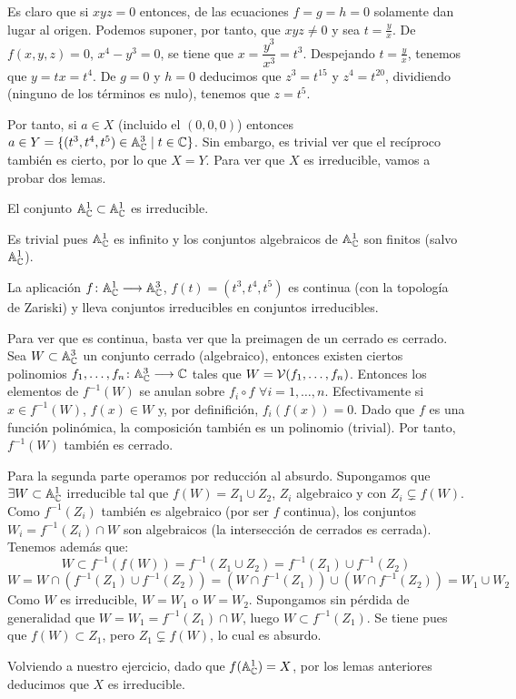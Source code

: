 \documentclass[twoside]{article}
\begin{document}
\begin{ejercicio}{6}
\begin{solucion}
\begin{enumerate}
Es claro que si $xyz = 0$ entonces, de las ecuaciones $f=g=h=0$ solamente dan lugar al origen. Podemos suponer, por tanto, que $xyz\neq 0$ y sea $t=\frac{y}{x}$. De $f(x,y,z)=0$, $x^4-y^3=0$, se tiene que $x=\dfrac{y^3}{x^3}=t^3$. Despejando $t=\frac{y}{x}$, tenemos que $y= tx = t^4$. De $g=0$ y $h=0$ deducimos que $z^3 = t^{15}$ y $z^4 = t^{20}$, dividiendo (ninguno de los términos es nulo), tenemos que $z=t^5$. 

Por tanto, si $a\in X$ (incluido el $(0,0,0)$) entonces $a\in Y=\{(t^3,t^4,t^5)\in\mathbb{A}^3_{\mathbb{C}}\mid t\in \mathbb{C}\}$. Sin embargo, es trivial ver que el recíproco también es cierto, por lo que $X=Y$. Para ver que $X$ es irreducible, vamos a probar dos lemas.

\begin{lema}
El conjunto $\mathbb{A}^1_{\mathbb{C}}\subset \mathbb{A}^1_{\mathbb{C}}$ es irreducible.
\end{lema}
\begin{dem}
Es trivial pues $\mathbb{A}^1_{\mathbb{C}}$ es infinito y los conjuntos algebraicos de $\mathbb{A}^1_{\mathbb{C}}$ son finitos (salvo $\mathbb{A}^1_{\mathbb{C}}$).
\end{dem}

\begin{lema}
La aplicación $f\colon{\mathbb{A}^1_{\mathbb{C}}}\longrightarrow{\mathbb{A}^3_{\mathbb{C}}}$, $f(t)=(t^3,t^4,t^5)$ es continua (con la topología de Zariski) y lleva conjuntos irreducibles en conjuntos irreducibles.
\end{lema}
\begin{dem}
Para ver que es continua, basta ver que la preimagen de un cerrado es cerrado. Sea $W \subset \mathbb{A}^3_{\mathbb{C}}$ un conjunto cerrado (algebraico), entonces existen ciertos polinomios $f_1,\dotsc,f_n\colon{\mathbb{A}^3_{\mathbb{C}}}\longrightarrow{\mathbb{C}}$ tales que $W=\mathcal{V}(f_1,\dotsc,f_n)$. Entonces los elementos de $f^{-1}(W)$ se anulan sobre $f_i \circ f$ $\forall i=1,\dotsc,n$. Efectivamente si $x\in f^{-1}(W)$, $f(x)\in W$ y, por definifición, $f_i(f(x)) = 0$. Dado que $f$ es una función polinómica, la composición también es un polinomio (trivial). Por tanto, $f^{-1}(W)$ también es cerrado.

Para la segunda parte operamos por reducción al absurdo. Supongamos que ${\exists W \subset \mathbb{A}^1_{\mathbb{C}}}$ irreducible tal que $f(W)=Z_1 \cup Z_2$, $Z_i$ algebraico y con $Z_i\subsetneq f(W)$. Como $f^{-1}(Z_i)$ también es algebraico (por ser $f$ continua), los conjuntos ${W_i = f^{-1}(Z_i)\cap W}$ son algebraicos (la intersección de cerrados es cerrada). Tenemos además que:
$$ W \subset f^{-1}(f(W)) = f^{-1}(Z_1\cup Z_2) = f^{-1}(Z_1)\cup f^{-1}(Z_2)$$
$$
W = W\cap (f^{-1}(Z_1)\cup f^{-1}(Z_2)) = (W\cap f^{-1}(Z_1))\cup(W \cap f^{-1}(Z_2)) = W_1 \cup W_2
$$
Como $W$ es irreducible, $W=W_1$ o $W=W_2$. Supongamos sin pérdida de generalidad que $W=W_1= f^{-1}(Z_1)\cap W$, luego $W \subset f^{-1}(Z_1)$. Se tiene pues que $f(W)\subset Z_1$, pero $Z_1 \subsetneq f(W)$, lo cual es absurdo.
\end{dem}
Volviendo a nuestro ejercicio, dado que $f(\mathbb{A}^1_{\mathbb{C}}) = X$, por los lemas anteriores deducimos que $X$ es irreducible.


\end{enumerate}
\end{solucion}
\end{ejercicio}
\end{document}
